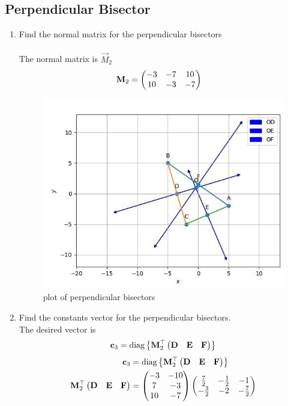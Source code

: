 \documentclass[10pt]{book}
\begin{document}
\subsection{Perpendicular Bisector}
\begin{enumerate}[label=\thesubsection.\arabic*.,ref=\thesubsection.\theenumi]
\item Find the normal matrix for the perpendicular bisectors \\
\solution\\
The normal matrix is $\vec{M}_2$
\begin{align}
       \mathbf{M}_2 &=\begin{pmatrix}-3 & -7 & 10 \\ 10 & -3 & -7\end{pmatrix}
\end{align}
\begin{figure}[H]
    \centering
    \includegraphics{figs/PPB2.jpg}
    \caption{plot of perpendicular bisectors}
    \label{fig:perpendicular_bisectors}
\end{figure}
\item Find the constants vector for the perpendicular bisectors. \\
\solution The desired vector is 
\begin{align}
\mathbf{c}_3 = \text{diag}\left\{\mathbf{M}_2^{\top}\begin{pmatrix}\mathbf{D} & \mathbf{E} &\mathbf{F}\end{pmatrix}\right\}
\end{align}
\solution
\begin{align}
\vec{c}_3 &= \text{diag}\cbrak{\vec{M}_2^{\top}\myvec{\vec{D} & \vec{E} &\vec{F}}} \\
\vec{M}_2^{\top}\myvec{\vec{D} & \vec{E} &\vec{F}} &= \myvec{-3&-10 \\ 7&-3 \\ 10 &-7}\myvec{\frac{7}{2} & -\frac{1}{2} & -1 \\ -\frac{3}{2} & -2 & -\frac{7}{2}} \\

\end{align}
\end{enumerate}
\end{document}

